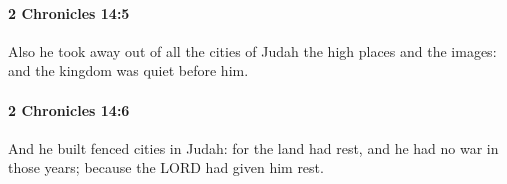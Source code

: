 		\paragraph{2 Chronicles 14:5} %
			\label{2CHRONICLES-14-5}

			Also he took away out of all the cities of Judah the high places and the images: and the kingdom was quiet before him.


		\paragraph{2 Chronicles 14:6} %
			\label{2CHRONICLES-14-6}

			And he built fenced cities in Judah: for the land had rest, and he had no war in those years; because the LORD had given him rest.


